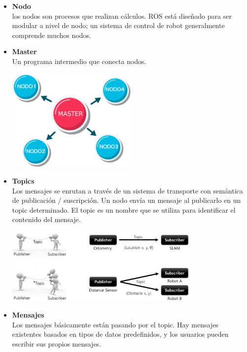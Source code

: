 \begin{itemize}
    \item \textbf{Nodo}\\
    los nodos son procesos que realizan cálculos. ROS está diseñado para ser modular
    a nivel de nodo; un sistema de control de robot generalmente comprende muchos nodos.
    \item \textbf{Master}\\
    Un programa intermedio que conecta nodos.
    \begin{center}
        \includegraphics[width=0.5\textwidth]{Capitulo2/Fig2.eps}
        \label{Fig2}
    \end{center}
    \item \textbf{Topics}\\
    Los mensajes se enrutan a través de un sistema de transporte con semántica de
    publicación / suscripción. Un nodo envía un mensaje al publicarlo en un topic
    determinado. El topic es un nombre que se utiliza para identificar el contenido del
    mensaje.
    \begin{center}
        \includegraphics[width=0.75\textwidth]{Capitulo2/Fig3.eps}
        \label{Fig3}
    \end{center}
    \item \textbf{Mensajes}\\
    Los mensajes básicamente están pasando por el topic. Hay mensajes existentes
    basados en tipos de datos predefinidos, y los usuarios pueden escribir sus
    propios mensajes.

\end{itemize}
